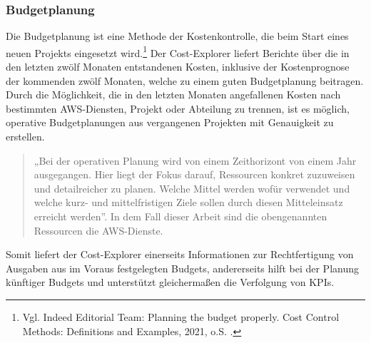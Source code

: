 \newpage
\subsubsection*{Budgetplanung}
Die Budgetplanung ist eine Methode der Kostenkontrolle, die beim Start eines neuen Projekts eingesetzt wird.\footnote{Vgl. Indeed Editorial Team: Planning the budget properly. Cost Control Methods: Definitions and Examples, 2021, o.S. \cite{BUD2}.} Der Cost-Explorer liefert Berichte über die in den letzten zwölf Monaten entstandenen Kosten, inklusive der Kostenprognose der kommenden zwölf Monaten, welche zu einem guten Budgetplanung beitragen.
Durch die Möglichkeit, die in den letzten Monaten angefallenen Kosten nach bestimmten AWS-Diensten, Projekt oder Abteilung zu trennen, ist es möglich, operative Budgetplanungen aus vergangenen Projekten mit Genauigkeit zu erstellen. 
\begin{quote}
  „Bei der operativen Planung wird von einem Zeithorizont von einem Jahr ausgegangen. Hier liegt der Fokus darauf, Ressourcen konkret zuzuweisen und detailreicher zu planen. Welche Mittel werden wofür verwendet und welche kurz- und mittelfristigen Ziele sollen durch diesen Mitteleinsatz erreicht werden”\cite{BUD1}.
  In dem Fall dieser Arbeit sind die obengenannten Ressourcen die AWS-Dienste.
\end{quote}
Somit liefert der Cost-Explorer einerseits Informationen zur Rechtfertigung von Ausgaben aus im Voraus festgelegten Budgets, andererseits hilft bei der Planung künftiger Budgets und unterstützt gleichermaßen die Verfolgung von KPIs. 
